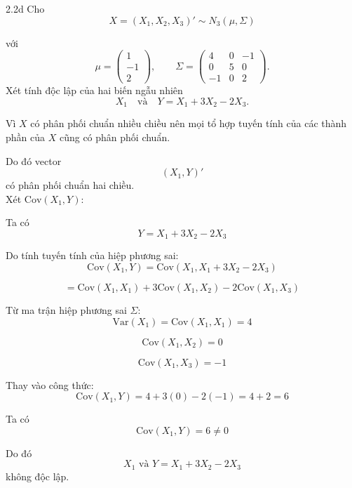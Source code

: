 \begin{question}{2.2d}
    Cho
\[
X = (X_1, X_2, X_3)' \sim N_3(\mu, \Sigma)
\]

với
\[
\mu =
\begin{pmatrix}
1\\
-1\\
2
\end{pmatrix},
\qquad
\Sigma =
\begin{pmatrix}
4 & 0 & -1\\
0 & 5 & 0\\
-1 & 0 & 2
\end{pmatrix}.
\]
Xét tính độc lập của hai biến ngẫu nhiên
\[
X_1
\quad \text{và} \quad
Y = X_1 + 3X_2 - 2X_3.
\]
 
\begin{answer}
Vì $X$ có phân phối chuẩn nhiều chiều nên mọi tổ hợp tuyến tính của các thành phần của $X$ cũng có phân phối chuẩn.

Do đó vector \[(X_1, Y)'\] có phân phối chuẩn hai chiều.\\

Xét $\mathrm{Cov}(X_1,Y)$:

Ta có
\[
Y = X_1 + 3X_2 - 2X_3
\]

Do tính tuyến tính của hiệp phương sai:
\[
\mathrm{Cov}(X_1,Y) = \mathrm{Cov}(X_1, X_1 + 3X_2 - 2X_3)
\]

\[
= \mathrm{Cov}(X_1,X_1) + 3\mathrm{Cov}(X_1,X_2) - 2\mathrm{Cov}(X_1,X_3)
\]

Từ ma trận hiệp phương sai $\Sigma$:
\[
\mathrm{Var}(X_1) = \mathrm{Cov}(X_1,X_1) = 4
\]

\[
\mathrm{Cov}(X_1,X_2) = 0
\]

\[
\mathrm{Cov}(X_1,X_3) = -1
\]

Thay vào công thức:
\[
\mathrm{Cov}(X_1,Y) = 4 + 3(0) - 2(-1)= 4 + 2= 6\]

Ta có
\[
\mathrm{Cov}(X_1,Y) = 6 \ne 0
\]

Do đó \[X_1 \text{ và } Y = X_1 + 3X_2 - 2X_3\] không độc lập.
    \end{answer}

\end{question}